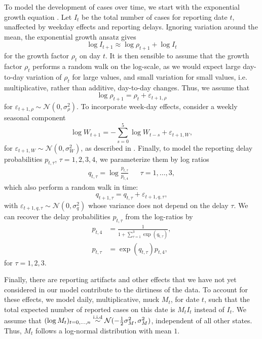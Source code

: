 To model the development of cases over time, we start with the exponential growth equation . Let $I_{t}$ be the total number of cases for reporting date $t$, unaffected by weekday effects and reporting delays. Ignoring variation around the mean, the exponential growth ansatz gives 
$$
    \log I_{t + 1} \approx \log \rho_{t + 1}  + \log I_{t}
$$
for the growth factor $\rho_{t}$ on day $t$. It is then sensible to assume that the growth factor $\rho_{t}$ performs a random walk on the log-scale, as we would expect large day-to-day variation of $\rho_{t}$ for large values, and small variation for small values, i.e. multiplicative, rather than additive, day-to-day changes. Thus, we assume that 
$$
    \log \rho_{t + 1} = \rho_{t} + \varepsilon_{t + 1, \rho}
$$
for $\varepsilon_{t + 1,\rho} \sim \mathcal N(0, \sigma^{2}_\rho)$. To incorporate week-day effects, consider a weekly seasonal component 
$$
    \log W_{t + 1} = - \sum_{s = 0}^{5} \log W_{t - s} + \varepsilon_{t + 1, W},
$$
for $\varepsilon_{t + 1, W} \sim \mathcal N(0, \sigma^{2}_{W})$, as described in . Finally, to model the reporting delay probabilities $p_{t,\tau}$, $\tau = 1,2,3,4$, we parameterize them by log ratios
\begin{align*}
    q_{t, \tau} = \log \frac{p_{t,\tau}}{p_{t,4}} && \tau = 1,\dots, 3,
\end{align*}
which also perform a random walk in time: 
$$
    q_{t + 1, \tau} = q_{t, \tau} + \varepsilon_{t+1, q, \tau},
$$
with $\varepsilon_{t + 1, q, \tau} \sim \mathcal N(0, \sigma^{2}_{q})$ whose variance does not depend on the delay $\tau$. We can recover the delay probabilities $p_{t, \tau}$ from the log-ratios by 
\begin{align*}
    p_{t, 4} &= \frac{1}{1 + \sum_{\tau = 1}^3 \exp \left( q_{t,\tau} \right)}, \\
    p_{t, \tau} &= \exp\left( q_{t, \tau} \right) p_{t, 4},
\end{align*}
for $\tau = 1, 2, 3$.

Finally, there are reporting artifacts and other effects that we have not yet considered in our model contribute to the dirtiness of the data. To account for these effects, we model daily, multiplicative, \glqq{}muck\grqq{} $M_{t}$, for date $t$, such that the total expected number of reported cases on this date is $M_{t}I_{t}$ instead of $I_{t}$. We assume that $(\log M_{t})_{t = 0, \dots, n} \stackrel{\text{i.i.d}}{\sim} \mathcal N(-\frac{1}{2}\sigma^{2}_M, \sigma^{2}_{M})$, independent of all other states. Thus, $M_{t}$ follows a log-normal distribution with mean $1$. 

